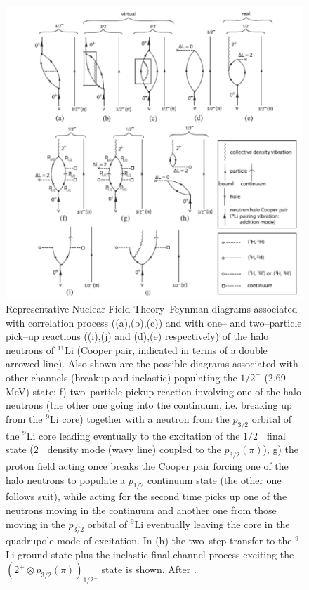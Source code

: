 \begin{subappendices}
  \begin{figure}
  \centerline{\includegraphics*[width=12cm,angle=0]{C8/figsC8/fig8_B_1x}}
  	\caption{Representative Nuclear Field Theory--Feynman diagrams associated with correlation process ((a),(b),(c)) and with one-- and two--particle pick--up reactions ((i),(j) and (d),(e) respectively) of the halo neutrons of $^{11}$Li (Cooper pair, indicated in terms of a double arrowed line). Also shown are the possible diagrams associated with other channels (breakup and inelastic) populating the $1/2^-$ (2.69 MeV) state: f) two--particle pickup reaction involving one of the halo neutrons (the other one going into the continuum, i.e. breaking up from the $^9$Li core) together with a neutron from the $p_{3/2}$ orbital of the $^9$Li core  leading eventually to the excitation of the $1/2^-$ final state ($2^+$ density mode (wavy line) coupled to the $p_{3/2}(\pi)$), g) the proton field acting once breaks the Cooper pair forcing one of the halo neutrons to populate a $p_{1/2}$ continuum state (the other one follows suit), while acting for the second time picks up one of the neutrons moving in the continuum and another one from those moving in the $p_{3/2}$ orbital of $^9$Li eventually leaving the core in the quadrupole mode of excitation. In (h) the  two--step transfer to the $^9$Li ground state plus the inelastic final channel process exciting the $(2^+\otimes p_{3/2}(\pi))_{1/2^-}$ state is shown. After \cite{Potel:10}.}\label{fig8_B_1}
  \end{figure}

\end{subappendices}
